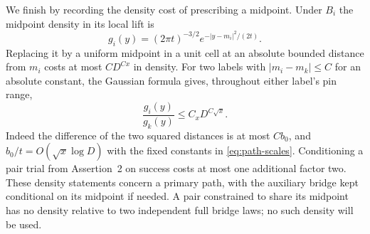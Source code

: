 We finish by recording the density cost of prescribing a midpoint.
Under $B_i$ the midpoint density in its local lift is
\begin{equation}\label{eq:bridge-midpoint-density}
                g_i(y)=(2\pi t)^{-3/2}
                         e^{-|y-m_i|^2/(2t)}.
\end{equation}
Replacing it by a uniform midpoint in a unit cell at an absolute
bounded distance from $m_i$ costs at most $CD^{Cx}$ in density.
For two labels with $|m_i-m_k|\le C$ for an absolute constant, the
Gaussian formula gives, throughout either label's pin range,
\begin{equation}\label{eq:midpoint-ratio}
                         \frac{g_i(y)}{g_k(y)}
                                   \le C_xD^{C\sqrt x}.
\end{equation}
Indeed the difference of the two squared distances is at most
$Cb_0$, and $b_0/t=O(\sqrt x\log D)$ with the fixed constants in
\eqref{eq:path-scales}.  Conditioning a pair trial from Assertion~2
on success costs at most one additional factor two.  These density
statements concern a primary path, with the auxiliary bridge kept
conditional on its midpoint if needed.  A pair constrained to share
its midpoint has no density relative to two independent full bridge
laws; no such density will be used.

